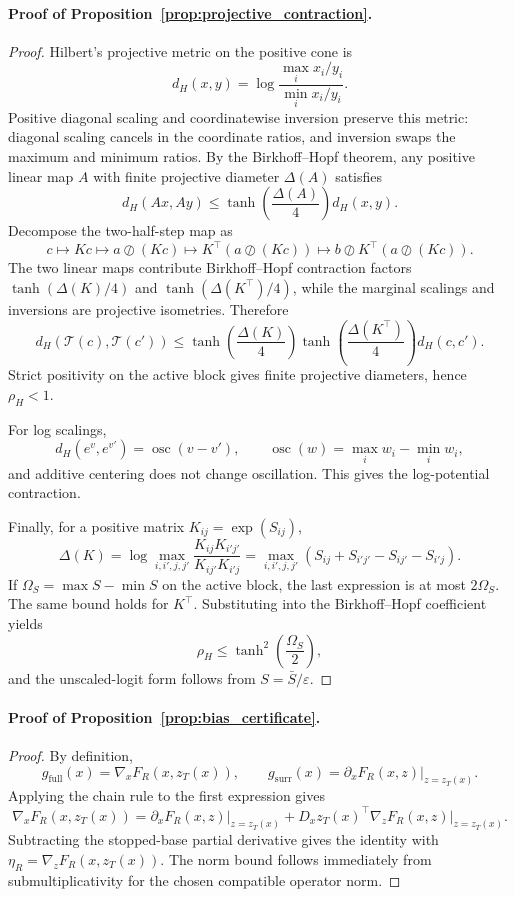\paragraph{Proof of Proposition~\ref{prop:projective_contraction}.}
\begin{proof}
Hilbert's projective metric on the positive cone is
\[
d_H(x,y)=
\log
\frac{\max_i x_i/y_i}{\min_i x_i/y_i}.
\]
Positive diagonal scaling and coordinatewise inversion preserve this metric: diagonal scaling cancels in the coordinate ratios, and inversion swaps the maximum and minimum ratios. By the Birkhoff--Hopf theorem, any positive linear map $A$ with finite projective diameter $\Delta(A)$ satisfies
\[
d_H(Ax,Ay)
\le
\tanh\!\left(\frac{\Delta(A)}{4}\right)d_H(x,y).
\]
Decompose the two-half-step map as
\[
c
\mapsto
Kc
\mapsto
a\oslash(Kc)
\mapsto
K^\top(a\oslash(Kc))
\mapsto
b\oslash K^\top(a\oslash(Kc)).
\]
The two linear maps contribute Birkhoff--Hopf contraction factors
$\tanh(\Delta(K)/4)$ and $\tanh(\Delta(K^\top)/4)$, while the marginal scalings and inversions are projective isometries. Therefore
\[
d_H(\mathcal{T}(c),\mathcal{T}(c'))
\le
\tanh\!\left(\frac{\Delta(K)}{4}\right)
\tanh\!\left(\frac{\Delta(K^\top)}{4}\right)
d_H(c,c').
\]
Strict positivity on the active block gives finite projective diameters, hence $\rho_H<1$.

For log scalings,
\[
d_H(e^v,e^{v'})
=
\operatorname{osc}(v-v'),
\qquad
\operatorname{osc}(w)=\max_i w_i-\min_i w_i,
\]
and additive centering does not change oscillation. This gives the log-potential contraction.

Finally, for a positive matrix $K_{ij}=\exp(S_{ij})$,
\[
\Delta(K)
=
\log\max_{i,i',j,j'}
\frac{K_{ij}K_{i'j'}}{K_{ij'}K_{i'j}}
=
\max_{i,i',j,j'}
\left(S_{ij}+S_{i'j'}-S_{ij'}-S_{i'j}\right).
\]
If $\Omega_S=\max S-\min S$ on the active block, the last expression is at most $2\Omega_S$. The same bound holds for $K^\top$. Substituting into the Birkhoff--Hopf coefficient yields
\[
\rho_H
\le
\tanh^2\!\left(\frac{\Omega_S}{2}\right),
\]
and the unscaled-logit form follows from $S=\bar S/\varepsilon$.
\end{proof}

\paragraph{Proof of Proposition~\ref{prop:bias_certificate}.}
\begin{proof}
By definition,
\[
g_{\mathrm{full}}(x)=\nabla_x F_R(x,z_T(x)),
\qquad
g_{\mathrm{surr}}(x)=\partial_x F_R(x,z)\big|_{z=z_T(x)}.
\]
Applying the chain rule to the first expression gives
\[
\nabla_x F_R(x,z_T(x))
=
\partial_x F_R(x,z)\big|_{z=z_T(x)}
+
D_xz_T(x)^\top \nabla_zF_R(x,z)\big|_{z=z_T(x)}.
\]
Subtracting the stopped-base partial derivative gives the identity with $\eta_R=\nabla_zF_R(x,z_T(x))$. The norm bound follows immediately from submultiplicativity for the chosen compatible operator norm.
\end{proof}

